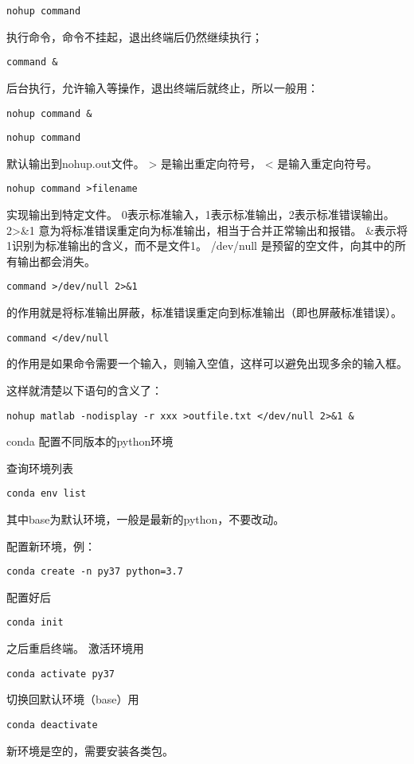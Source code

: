 \documentclass{article}
\begin{document}
\begin{lstlisting}
nohup command
\end{lstlisting}

执行命令，命令不挂起，退出终端后仍然继续执行；
\begin{lstlisting}
command &
\end{lstlisting}
后台执行，允许输入等操作，退出终端后就终止，所以一般用：
\begin{lstlisting}
nohup command &
\end{lstlisting}
\begin{lstlisting}
nohup command
\end{lstlisting}
默认输出到nohup.out文件。
> 是输出重定向符号， < 是输入重定向符号。
\begin{lstlisting}
nohup command >filename
\end{lstlisting}
实现输出到特定文件。
0表示标准输入，1表示标准输出，2表示标准错误输出。
2>\&1 意为将标准错误重定向为标准输出，相当于合并正常输出和报错。
\&表示将1识别为标准输出的含义，而不是文件1。
/dev/null 是预留的空文件，向其中的所有输出都会消失。
\begin{lstlisting}
command >/dev/null 2>&1
\end{lstlisting}
的作用就是将标准输出屏蔽，标准错误重定向到标准输出（即也屏蔽标准错误）。
\begin{lstlisting}
command </dev/null
\end{lstlisting}
的作用是如果命令需要一个输入，则输入空值，这样可以避免出现多余的输入框。

这样就清楚以下语句的含义了：
\begin{lstlisting}
nohup matlab -nodisplay -r xxx >outfile.txt </dev/null 2>&1 &
\end{lstlisting}


conda 配置不同版本的python环境

查询环境列表
\begin{lstlisting}
conda env list
\end{lstlisting}
其中base为默认环境，一般是最新的python，不要改动。

配置新环境，例：
\begin{lstlisting}
conda create -n py37 python=3.7
\end{lstlisting}
配置好后
\begin{lstlisting}
conda init
\end{lstlisting}
之后重启终端。
激活环境用
\begin{lstlisting}
conda activate py37
\end{lstlisting}
切换回默认环境（base）用
\begin{lstlisting}
conda deactivate
\end{lstlisting}
新环境是空的，需要安装各类包。
\end{document}
